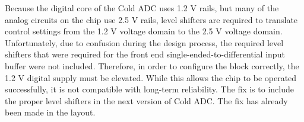 \label{sec:5.2}


Because the digital core of the Cold ADC uses 1.2 V rails, but many of the analog circuits on the chip use 2.5 V rails, level shifters are required to translate control settings from the 1.2 V voltage domain to the 2.5 V voltage domain. Unfortunately, due to confusion during the design process, the required level shifters that were required for the front end single-ended-to-differential input buffer were not included. Therefore, in order to configure the block correctly, the 1.2 V digital supply must be elevated. While this allows the chip to be operated successfully, it is not compatible with long-term reliability. The fix is to include the proper level shifters in the next version of Cold ADC. The fix has already been made in the layout.

